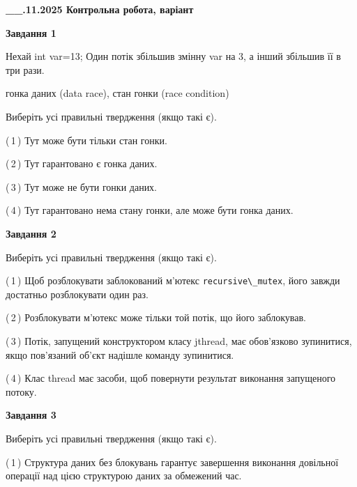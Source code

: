 \documentclass[12pt, ukrainian]{article}
\def\code#1{\Verb!#1!}
\begin{document}
\begin {large}

\textbf{\_\_.11.2025 Контрольна робота, варіант  }\par


{

\begin{center}
\textbf{Завдання 1}
\end{center}
Нехай int var=13; Один потік збільшив змінну var на 3, а інший збільшив її в три рази.

гонка даних (data race), стан гонки (race condition)

Виберіть усі правильні твердження (якщо такі є).\par
\vspace{2mm}
(\,1\,) Тут може бути тільки стан гонки.%

(\,2\,) Тут гарантовано є гонка даних.%

(\,3\,) Тут може не бути гонки даних.%

(\,4\,) Тут гарантовано нема стану гонки, але може бути гонка даних.%



\begin{center}
\textbf{Завдання 2}
\end{center}
Виберіть усі правильні твердження (якщо такі є).\par
\vspace{2mm}

(\,1\,) Щоб розблокувати заблокований м’ютекс \code{recursive\_mutex}, його завжди достатньо розблокувати один раз.%

(\,2\,) Розблокувати м’ютекс може тільки той потік, що його заблокував.%

(\,3\,) Потік, запущений конструктором класу jthread, має обов’язково зупинитися, якщо пов’язаний об’єкт надішле команду зупинитися.%

(\,4\,) Клас thread має засоби, щоб повернути результат виконання запущеного потоку.%



\begin{center}
\textbf{Завдання 3}
\end{center}
Виберіть усі правильні твердження (якщо такі є).\par
\vspace{2mm}

(\,1\,) Структура даних без блокувань гарантує завершення виконання довільної операції над цією структурою даних за обмежений час.%

}
\end{large}
\end{document}
